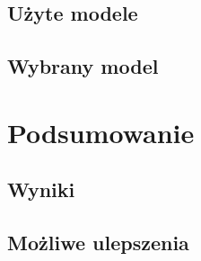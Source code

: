 \documentclass[a4paper,12pt]{article}
\begin{document}
    \subsection{Użyte modele}

    \subsection{Wybrany model}

    \section{Podsumowanie}

    \subsection{Wyniki}

    \subsection{Możliwe ulepszenia}

    
    
\end{document}

